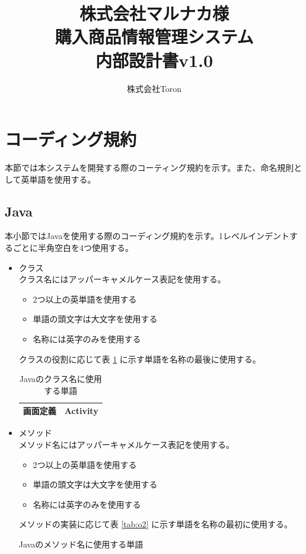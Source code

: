 \documentclass[a4j]{jarticle}
\title{
\vspace{30mm}
株式会社マルナカ様\\
購入商品情報管理システム\\
内部設計書v1.0
\vspace{90mm}
}
\author{
株式会社Toron
}
\begin{document}
\maketitle
\newpage
\tableofcontents
\newpage
\section{コーディング規約}

本節では本システムを開発する際のコーティング規約を示す。また、命名規則として英単語を使用する。
\subsection{Java}

本小節ではJavaを使用する際のコーディング規約を示す。1レベルインデントするごとに半角空白を4つ使用する。
\begin{itemize}
	\item クラス\\
		クラス名にはアッパーキャメルケース表記を使用する。
	\begin{itemize}
		\item 2つ以上の英単語を使用する
		\item 単語の頭文字は大文字を使用する
		\item 名称には英字のみを使用する
	\end{itemize}
		クラスの役割に応じて表 \ref{tab:o1} に示す単語を名称の最後に使用する。
		\begin{table}[H]
			\caption{Javaのクラス名に使用する単語}
			\label{tab:o1}
			\begin{center}
			\begin{tabular}{|c|c|}
			\hline
			画面定義 & Activity\\\hline
			\end{tabular}
			\end{center}
			\end{table}
	\item メソッド\\
		メソッド名にはアッパーキャメルケース表記を使用する。
	\begin{itemize}
		\item 2つ以上の英単語を使用する
		\item 単語の頭文字は大文字を使用する
		\item 名称には英字のみを使用する
	\end{itemize}
		メソッドの実装に応じて表 \ref {tab:o2} に示す単語を名称の最初に使用する。
				\begin{table}[H]
			\caption{Javaのメソッド名に使用する単語}

\end{table}
\end{itemize}
\end{document}
